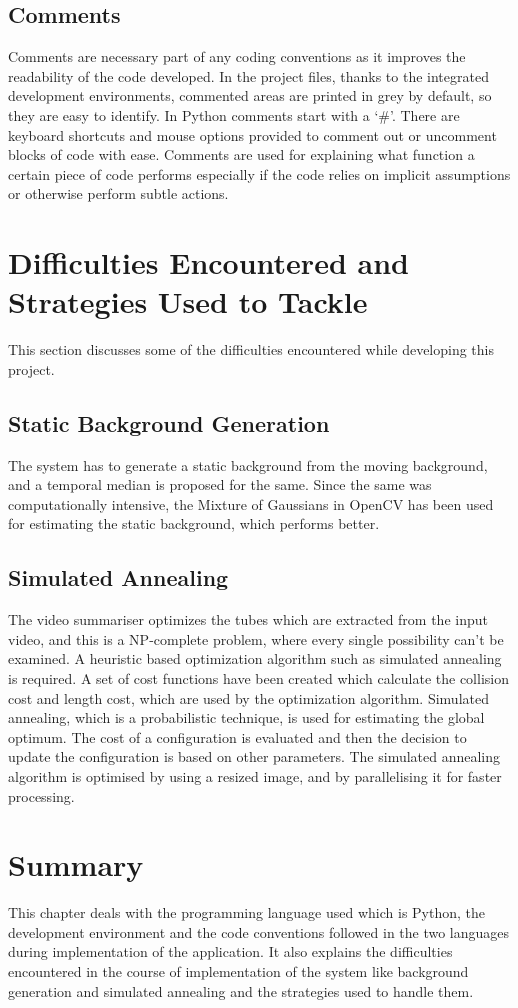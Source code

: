     \subsection{Comments}
    Comments are necessary part of any coding conventions as it improves the
    readability of the code developed. In the project files, thanks to the
    integrated development environments, commented areas are printed in grey by
    default, so they are easy to identify.
    In Python comments start with a ‘\#’. There are keyboard shortcuts and
    mouse options provided to comment out or uncomment blocks of code with ease.
    Comments are used for explaining what function a certain piece of code
    performs especially if the code relies on implicit assumptions or otherwise
    perform subtle actions.

\section{Difficulties Encountered and Strategies Used to Tackle}
This section discusses some of the difficulties encountered while developing
this project.

    \subsection{Static Background Generation}
    The system has to generate a static background from the moving background,
    and a temporal median is proposed for the same. Since the same was
    computationally intensive, the Mixture of Gaussians in OpenCV has been used
    for estimating the static background, which performs better.

    \subsection{Simulated Annealing}
    The video summariser optimizes the tubes which are extracted from the input
    video, and this is a NP-complete problem, where every single
    possibility can't be examined. A heuristic based optimization algorithm such
    as simulated annealing is required. A set of cost functions have been
    created which calculate the collision cost and length cost, which are used
    by the optimization algorithm. Simulated annealing, which is a probabilistic
    technique, is used for estimating the global optimum. The cost of a
    configuration is evaluated and then the decision to update the configuration
    is based on other parameters. The simulated annealing algorithm is
    optimised by using a resized image, and by parallelising it for faster
    processing.

\section{Summary}
This chapter deals with the programming language used which is Python, the
development environment and the code conventions followed in the two languages
during implementation of the application. It also explains the difficulties
encountered in the course of implementation of the system like background
generation and simulated annealing and the strategies used to handle them.